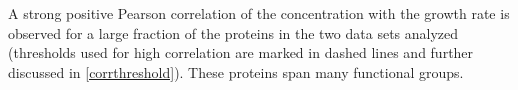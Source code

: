 \label{fig:growthcorr}
A strong positive Pearson correlation of the concentration with the growth rate is observed for a large fraction of the proteins in the two data sets analyzed (thresholds used for high correlation are marked in dashed lines and further discussed in \ref{corrthreshold}).
These proteins span many functional groups.
